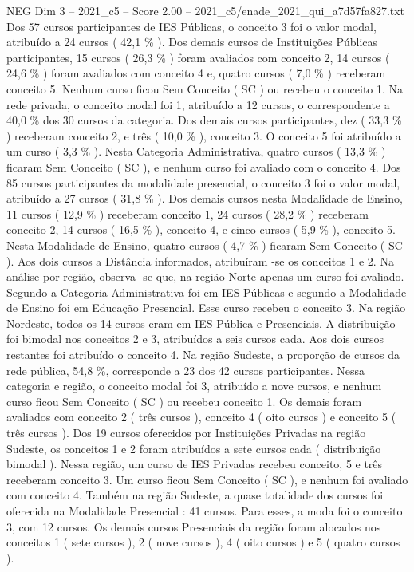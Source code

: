 \begin{textsample}{NEG Dim 3 – 2021\_c5 – Score 2.00 – 2021\_c5/enade\_2021\_qui\_a7d57fa827.txt}
Dos 57 cursos participantes de IES Públicas, o conceito 3 foi o valor modal, atribuído a 24 cursos ( 42,1 \% ).
Dos demais cursos de Instituições Públicas participantes, 15 cursos ( 26,3 \% ) foram avaliados com conceito 2, 14 cursos ( 24,6 \% ) foram avaliados com conceito 4 e, quatro cursos ( 7,0 \% ) receberam conceito 5.
Nenhum curso ficou Sem Conceito ( SC ) ou recebeu o conceito 1.
Na rede privada, o conceito modal foi 1, atribuído a 12 cursos, o correspondente a 40,0 \% dos 30 cursos da categoria.
Dos demais cursos participantes, dez ( 33,3 \% ) receberam conceito 2, e três ( 10,0 \% ), conceito 3.
O conceito 5 foi atribuído a um curso ( 3,3 \% ).
Nesta Categoria Administrativa, quatro cursos ( 13,3 \% ) ficaram Sem Conceito ( SC ), e nenhum curso foi avaliado com o conceito 4.
Dos 85 cursos participantes da modalidade presencial, o conceito 3 foi o valor modal, atribuído a 27 cursos ( 31,8 \% ).
Dos demais cursos nesta Modalidade de Ensino, 11 cursos ( 12,9 \% ) receberam conceito 1, 24 cursos ( 28,2 \% ) receberam conceito 2, 14 cursos ( 16,5 \% ), conceito 4, e cinco cursos ( 5,9 \% ), conceito 5.
Nesta Modalidade de Ensino, quatro cursos ( 4,7 \% ) ficaram Sem Conceito ( SC ).
Aos dois cursos a Distância informados, atribuíram -se os conceitos 1 e 2.
Na análise por região, observa -se que, na região Norte apenas um curso foi avaliado.
Segundo a Categoria Administrativa foi em IES Públicas e segundo a Modalidade de Ensino foi em Educação Presencial.
Esse curso recebeu o conceito 3.
Na região Nordeste, todos os 14 cursos eram em IES Pública e Presenciais.
A distribuição foi bimodal nos conceitos 2 e 3, atribuídos a seis cursos cada.
Aos dois cursos restantes foi atribuído o conceito 4.
Na região Sudeste, a proporção de cursos da rede pública, 54,8 \%, corresponde a 23 dos 42 cursos participantes.
Nessa categoria e região, o conceito modal foi 3, atribuído a nove cursos, e nenhum curso ficou Sem Conceito ( SC ) ou recebeu conceito 1.
Os demais foram avaliados com conceito 2 ( três cursos ), conceito 4 ( oito cursos ) e conceito 5 ( três cursos ).
Dos 19 cursos oferecidos por Instituições Privadas na região Sudeste, os conceitos 1 e 2 foram atribuídos a sete cursos cada ( distribuição bimodal ).
Nessa região, um curso de IES Privadas recebeu conceito, 5 e três receberam conceito 3.
Um curso ficou Sem Conceito ( SC ), e nenhum foi avaliado com conceito 4.
Também na região Sudeste, a quase totalidade dos cursos foi oferecida na Modalidade Presencial : 41 cursos.
Para esses, a moda foi o conceito 3, com 12 cursos.
Os demais cursos Presenciais da região foram alocados nos conceitos 1 ( sete cursos ), 2 ( nove cursos ), 4 ( oito cursos ) e 5 ( quatro cursos ).

\end{textsample}

